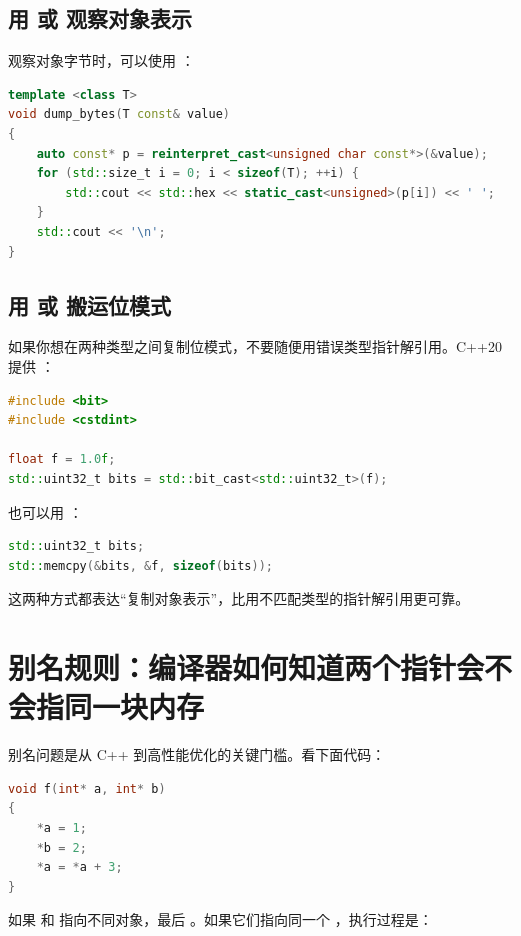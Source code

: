 \subsection{用  或  观察对象表示}

观察对象字节时，可以使用 ：

\begin{lstlisting}[language=C++]
template <class T>
void dump_bytes(T const& value)
{
    auto const* p = reinterpret_cast<unsigned char const*>(&value);
    for (std::size_t i = 0; i < sizeof(T); ++i) {
        std::cout << std::hex << static_cast<unsigned>(p[i]) << ' ';
    }
    std::cout << '\n';
}
\end{lstlisting}

\subsection{用  或  搬运位模式}

如果你想在两种类型之间复制位模式，不要随便用错误类型指针解引用。C++20 提供 ：

\begin{lstlisting}[language=C++]
#include <bit>
#include <cstdint>

float f = 1.0f;
std::uint32_t bits = std::bit_cast<std::uint32_t>(f);
\end{lstlisting}

也可以用 ：

\begin{lstlisting}[language=C++]
std::uint32_t bits;
std::memcpy(&bits, &f, sizeof(bits));
\end{lstlisting}

这两种方式都表达“复制对象表示”，比用不匹配类型的指针解引用更可靠。

\section{别名规则：编译器如何知道两个指针会不会指同一块内存}

别名问题是从 C++ 到高性能优化的关键门槛。看下面代码：

\begin{lstlisting}[language=C++]
void f(int* a, int* b)
{
    *a = 1;
    *b = 2;
    *a = *a + 3;
}
\end{lstlisting}

如果  和  指向不同对象，最后 。如果它们指向同一个 ，执行过程是：

